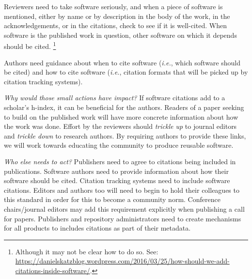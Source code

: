 \documentclass[a4paper,UKenglish]{dagman}
\newcommand{\ie}{\emph{i.e.},\xspace}
\begin{document}
Reviewers need to take software seriously, and when a piece of software is mentioned, either by name or by description in the body of the work, in the acknowledgements, or in the citations, check to see if it is well-cited.  When software is the published work in question, other software on which it depends should be cited.%
\footnote{Although it may not be clear how to do so. See:\\ \url{https://danielskatzblog.wordpress.com/2016/03/25/how-should-we-add-citations-inside-software/}.}

Authors need guidance about when to cite software (\ie which software should be cited) and how to cite software (\ie citation formats that will be picked up by citation tracking systems).

\emph{Why would those small actions have impact?}
If software citations add to a scholar's h-index, it can be beneficial for the authors. Readers of a paper seeking to build on the published work will have more concrete information about how the work was done.
Effort by the reviewers should \emph{trickle up} to journal editors and \emph{trickle down} to research authors.
By requiring authors to provide these links, we will work towards educating the community to produce reusable software.

\emph{Who else needs to act?} Publishers need to agree to citations being included in publications. Software authors need to provide information about how their software should be cited. Citation tracking systems need to include software citations.
Editors and authors too will need to begin to hold their colleagues to this standard in order for this to become a community norm.
Conference chairs/journal editors may add this requirement explicitly when publishing a call for papers. Publishers and repository administrators
need to create mechanisms for all products to includes citations as part of their metadata.




\end{document}
